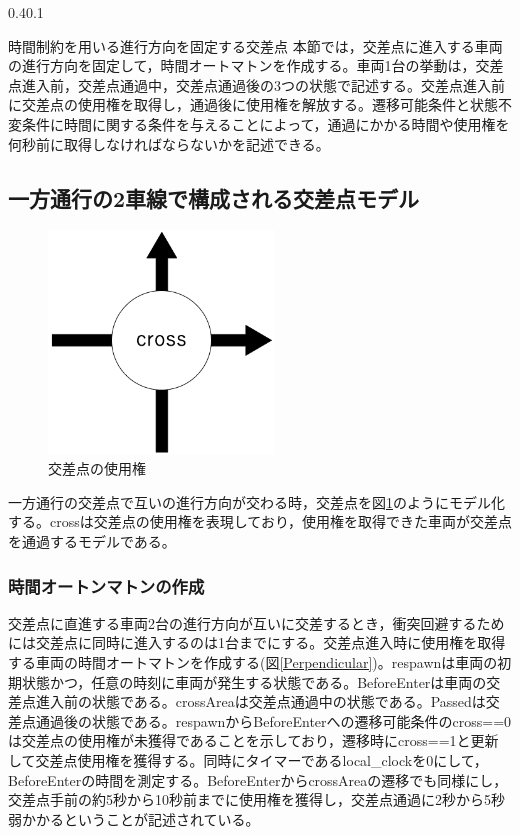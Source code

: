 \documentclass[twocolumn,10pt]{jsarticle}
\makeatletter
\renewcommand{\section}{%
   \@startsection{section}{1}{\z@}%
   {0.4\Cvs}{0.1\Cvs}%
   {\normalfont\large\headfont\raggedright}}
\makeatother
\begin{document}
	
	\section{時間制約を用いる進行方向を固定する交差点}
	本節では，交差点に進入する車両の進行方向を固定して，時間オートマトン\cite{u3}を作成する。車両1台の挙動は，交差点進入前，交差点通過中，交差点通過後の3つの状態で記述する。交差点進入前に交差点の使用権を取得し，通過後に使用権を解放する。遷移可能条件と状態不変条件に時間に関する条件を与えることによって，通過にかかる時間や使用権を何秒前に取得しなければならないかを記述できる。
	\subsection{一方通行の2車線で構成される交差点モデル}
	\begin{figure}[htbp]
	\centering
	\includegraphics[width=60mm]{SimplePerpendicular.png}
	\caption{交差点の使用権}
	\label{SimpleP}
	\end{figure}
	一方通行の交差点で互いの進行方向が交わる時，交差点を図\ref{SimpleP}のようにモデル化する。crossは交差点の使用権を表現しており，使用権を取得できた車両が交差点を通過するモデルである。
	\subsubsection{時間オートンマトンの作成}
	交差点に直進する車両2台の進行方向が互いに交差するとき，衝突回避するためには交差点に同時に進入するのは1台までにする。交差点進入時に使用権を取得する車両の時間オートマトンを作成する(図\ref{Perpendicular})。respawnは車両の初期状態かつ，任意の時刻に車両が発生する状態である。BeforeEnterは車両の交差点進入前の状態である。crossAreaは交差点通過中の状態である。Passedは交差点通過後の状態である。respawnからBeforeEnterへの遷移可能条件のcross==0は交差点の使用権が未獲得であることを示しており，遷移時にcross==1と更新して交差点使用権を獲得する。同時にタイマーであるlocal\_clockを0にして，BeforeEnterの時間を測定する。BeforeEnterからcrossAreaの遷移でも同様にし，交差点手前の約5秒から10秒前までに使用権を獲得し，交差点通過に2秒から5秒弱かかるということが記述されている。
	
\end{document}
